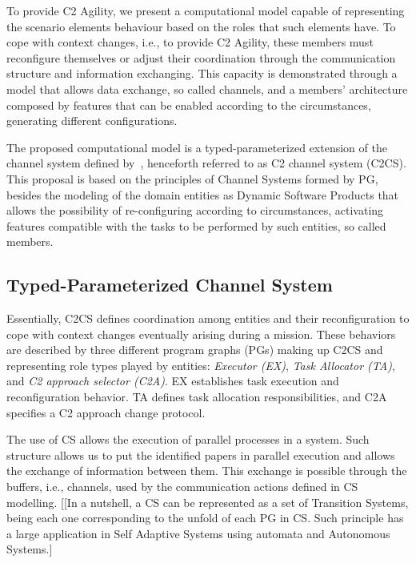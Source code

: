 
To provide C2 Agility, we present a computational model capable of representing the scenario elements behaviour based on the roles that such elements have. To cope with context changes, i.e., to provide C2 Agility, these members must reconfigure themselves or adjust their coordination through the communication structure and information exchanging. This capacity is demonstrated through a model that allows data exchange, so called channels, and a members' architecture  composed by features that can be enabled according to the circumstances, generating different configurations.

The proposed computational model is a typed-parameterized extension of the channel system defined by~\cite{MC01}, henceforth referred to as C2 channel system (C2CS). This proposal is based on the principles of Channel Systems formed by PG, besides the modeling of the domain entities as Dynamic Software Products that allows the possibility of re-configuring according to circumstances, activating features compatible with the tasks to be performed by such entities, so called members.



\subsection{Typed-Parameterized Channel System}
\label{sec:channelSystem}


Essentially, C2CS defines coordination among entities and their reconfiguration to cope with context changes eventually arising during a mission. These behaviors are described by three different program graphs (PGs) making up C2CS and representing role types played by entities: \textit{Executor (EX)}, \textit{Task Allocator (TA)}, and \textit{C2 approach selector (C2A)}. EX establishes task execution and reconfiguration behavior. TA defines task allocation responsibilities, and C2A specifies a C2 approach change protocol. 

The use of CS allows the execution of parallel processes in a system. Such structure allows us to put the identified papers in parallel execution and allows the exchange of information between them. This exchange is possible through the buffers, i.e., channels, used by the communication actions defined in CS modelling. [[In a nutshell, a CS can be represented as a set of Transition Systems, being each one corresponding to the unfold of each PG in CS. Such principle has a large application in Self Adaptive Systems using automata and Autonomous Systems.]

